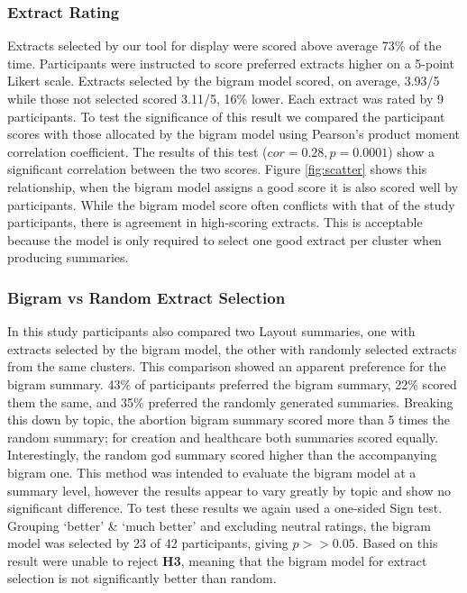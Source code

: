       \tocless\subsubsection{Extract Rating}
	      \noindent Extracts selected by our tool for display were scored above average 73\% of the time. Participants were instructed to score preferred extracts higher on a 5-point Likert scale. Extracts selected by the bigram model scored, on average, 3.93/5 while those not selected scored 3.11/5, 16\% lower. Each extract was rated by 9 participants. To test the significance of this result we compared the participant scores with those allocated by the bigram model using Pearson's product moment correlation coefficient. The results of this test ($cor = 0.28, p = 0.0001$) show a significant correlation between the two scores. Figure \ref{fig:scatter} shows this relationship, when the bigram model assigns a good score it is also scored well by participants. While the bigram model score often conflicts with that of the study participants, there is agreement in high-scoring extracts. This is acceptable because the model is only required to select one good extract per cluster when producing summaries.

      \tocless\subsubsection{Bigram vs Random Extract Selection}
	      \noindent In this study participants also compared two Layout summaries, one with extracts selected by the bigram model, the other with randomly selected extracts from the same clusters. This comparison showed an apparent preference for the bigram summary. 43\% of participants preferred the bigram summary, 22\% scored them the same, and 35\% preferred the randomly generated summaries. Breaking this down by topic, the abortion bigram summary scored more than 5 times the random summary; for creation and healthcare both summaries scored equally. Interestingly, the random god summary scored higher than the accompanying bigram one. This method was intended to evaluate the bigram model at a summary level, however the results appear to vary greatly by topic and show no significant difference. To test these results we again used a one-sided Sign test. Grouping `better' \& `much better' and excluding neutral ratings, the bigram model was selected by 23 of 42 participants, giving $p >> 0.05$. Based on this result were unable to reject \textbf{H3}, meaning that the bigram model for extract selection is not significantly better than random.

